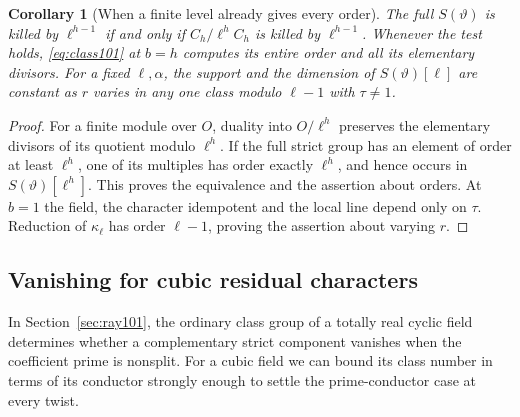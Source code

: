 \documentclass[a4paper,11pt]{article}
\newtheorem{corollary}[proposition]{Corollary}
\theoremstyle{definition}
\theoremstyle{remark}
\numberwithin{equation}{section}
\begin{document}
\begin{corollary}[When a finite level already gives every order]
\label{cor:stopped101}
The full \(S(\vartheta)\) is killed by \(\ell^{h-1}\) if and only
if \(C_h/\ell^h C_h\) is killed by \(\ell^{h-1}\). Whenever the
test holds, \eqref{eq:class101} at \(b=h\) computes its entire
order and all its elementary divisors. For a fixed \(\ell,\alpha\),
the support and the dimension of \(S(\vartheta)[\ell]\) are
constant as \(r\) varies in any one class modulo \(\ell-1\)
with \(\tau\ne1\).
\end{corollary}
\begin{proof}
For a finite module over \(O\), duality into \(O/\ell^h\)
preserves the elementary divisors of its quotient modulo
\(\ell^h\). If the full strict group has an element of order
at least \(\ell^h\), one of its multiples has order exactly
\(\ell^h\), and hence occurs in \(S(\vartheta)[\ell^h]\).
This proves the equivalence and the assertion about orders.
At \(b=1\) the field, the character idempotent and the local
line depend only on \(\tau\). Reduction of \(\kappa_\ell\) has
order \(\ell-1\), proving the assertion about varying \(r\).
\end{proof}

\subsection{Vanishing for cubic residual characters}\label{nav:III-15}
\label{sec:cubic105}

In Section~\ref{sec:ray101}, the ordinary class group of a
totally real cyclic field determines whether a complementary
strict component vanishes when the coefficient prime is nonsplit.
For a cubic field we can bound its class number in terms of its
conductor strongly enough to settle the prime-conductor case at
every twist.
\end{document}
